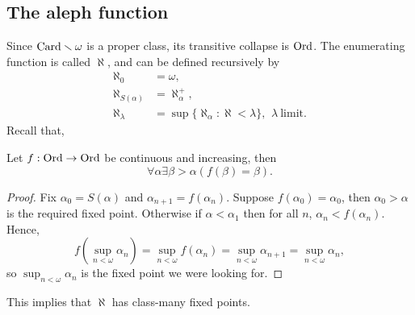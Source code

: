 \documentclass[twoside,openright,titlepage,numbers=noenddot,%
               headinclude,footinclude,cleardoublepage=empty,abstract=on,
               BCOR=23mm,paper=letter,fontsize=11pt
               ]{scrreprt}
\begin{document}
\subsection{The aleph function}
Since $\mathrm{Card} \smallsetminus \omega$ is a proper class, its transitive collapse is $\mathrm{Ord}$. The enumerating function is called $\aleph$, and can be defined recursively by 
\begin{align*}
    \aleph_0 &= \omega, \\
    \aleph_{S(\alpha)} &= \aleph_{\alpha}^{+}, \\
    \aleph_{\lambda} &= \sup\{\aleph_{\alpha}: \aleph < \lambda\}, \,\ \lambda \ \text{limit}.
\end{align*}
Recall that,
\begin{theorem}
    Let $f: \mathrm{Ord} \to \mathrm{Ord}$ be continuous and increasing, then
    \[ \forall \alpha \exists \beta > \alpha (f(\beta) = \beta). \]
\end{theorem}
\begin{proof}
    Fix $\alpha_{0} = S(\alpha)$ and $\alpha_{n+1} = f(\alpha_{n})$. Suppose $f(\alpha_0) = \alpha_0$, then $\alpha_0 > \alpha$ is the required fixed point. Otherwise if $\alpha < \alpha_1$ then for all $n$, $\alpha_n < f(\alpha_n)$. Hence,
    \[ f(\sup_{n < \omega} \alpha_n) = \sup_{n < \omega} f(\alpha_n) = \sup_{n < \omega} \alpha_{n+1} = \sup_{n < \omega} \alpha_n, \]
    so $\sup_{n < \omega} \alpha_n$ is the fixed point we were looking for.
\end{proof}
This implies that $\aleph$ has class-many fixed points.
\end{document}
